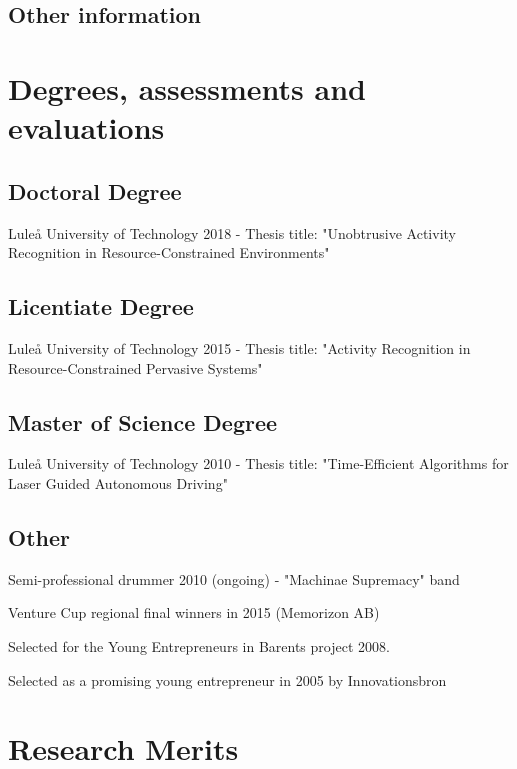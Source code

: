 \documentclass{article}
\begin{document}
\subsection{Other information}

\newpage

\section{Degrees, assessments and evaluations}
\subsection{Doctoral Degree}
Luleå University of Technology 2018 - Thesis title: "Unobtrusive Activity Recognition in Resource-Constrained Environments" \\

\subsection{Licentiate Degree}
Luleå University of Technology 2015 - Thesis title: "Activity Recognition in Resource-Constrained Pervasive Systems" \\

\subsection{Master of Science Degree}
Luleå University of Technology 2010 - Thesis title: "Time-Efficient Algorithms for Laser Guided Autonomous Driving" \\

\subsection{Other}
\begin{description}
\item Semi-professional drummer 2010 (ongoing) - "Machinae Supremacy" band
\item Venture Cup regional final winners in 2015 (Memorizon AB)
\item Selected for the Young Entrepreneurs in Barents project 2008.
\item Selected as a promising young entrepreneur in 2005 by Innovationsbron
\end{description}


\newpage

\section{Research Merits}
\end{document}
